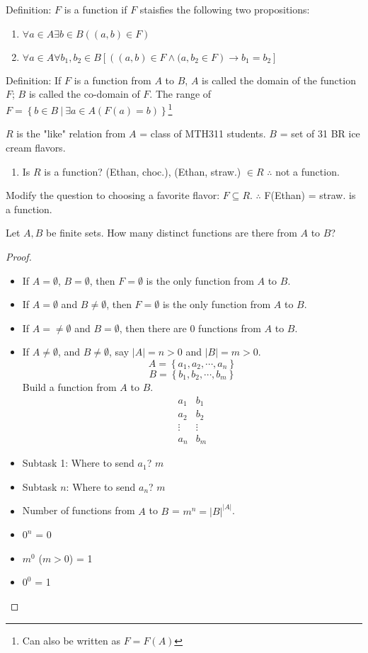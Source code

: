 \noindent
Definition: $F$ is a function if $F$ staisfies the following two propositions:
\begin{enumerate}
\item $\forall a \in A \exists b \in B \left( (a,b) \in F \right)$
\item $\forall a \in A \forall b_1,b_2\in B \left[ \left( (a,b) \in F \wedge (a,b_2\in F \right) \to b_1=b_2 \right]$
\end{enumerate}

\noindent
Definition: If $F$ is a function from $A$ to $B$, $A$ is called the domain of the function $F$; $B$ is called the co-domain of $F$. The range of $F = \left\{ b\in B\ |\ \exists a \in A (F(a)=b) \right\}$\footnote{Can also be written as $F=F(A)$}
\begin{example}
$R$ is the "like" relation from $A$ = class of MTH311 students. $B$ = set of 31 BR ice cream flavors.
\begin{enumerate}
\item Is $R$ is a function? (Ethan, choc.), (Ethan, straw.) $\in R$ $\therefore$ not a function.
\end{enumerate}
Modify the question to choosing a favorite flavor: $F\subseteq R$. $\therefore$ F(Ethan) = straw. is a function.
\end{example}
\begin{proposition}
Let $A,B$ be finite sets. How many distinct functions are there from $A$ to $B$?
\end{proposition}
\begin{proof}
\begin{itemize}
\item If $A=\emptyset$, $B=\emptyset$, then $F=\emptyset$ is the only function from $A$ to $B$.
\item If $A=\emptyset$ and $B\neq\emptyset$, then $F=\emptyset$ is the only function from $A$ to $B$.
\item If $A=\neq\emptyset$ and $B=\emptyset$, then there are 0 functions from $A$ to $B$.
\item If $A\neq\emptyset$, and $B\neq\emptyset$, say $|A| = n > 0$ and $|B| = m > 0$.
\[ A = \left\{ a_1,a_2,\cdots,a_n\right\} \]
\[ B = \left\{ b_1,b_2,\cdots,b_m\right\} \]
Build a function from $A$ to $B$.
\[ \begin{matrix} a_1 & b_1\\ a_2 & b_2 \\ \vdots & \vdots \\ a_n & b_m\end{matrix}\]
\item Subtask 1: Where to send $a_1$? $m$
\item Subtask $n$: Where to send $a_n$? $m$
\item Number of functions from $A$ to $B$ = $m^n = |B|^{|A|}$.
\item $0^n$ = 0
\item $m^0$ ($m > 0$) = 1
\item $0^0$ = 1
\end{itemize}
\end{proof}
